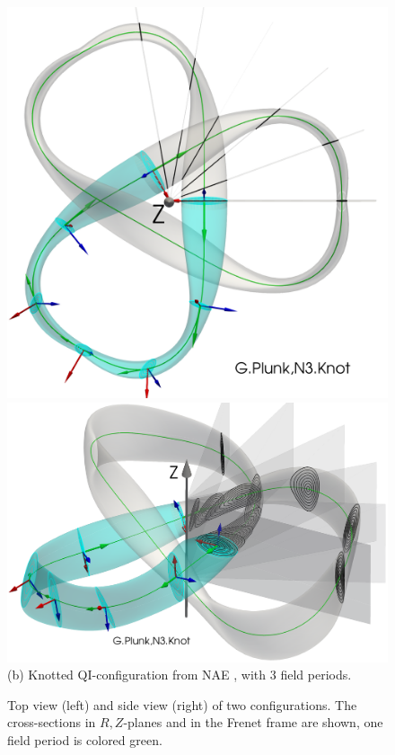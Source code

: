 \documentclass[12pt]{iopart}
\newcommand\RZplanes[1]{$R,Z$-planes{#1}}
\begin{document}
\begin{figure}[htbp!]
    \includegraphics[trim=0 0 0 0,clip,height=0.2\textheight]{pics/qi_nae_N3-Knot_visu3D_compare_topview.png}
    \includegraphics[trim=0 0 0 0,clip,height=0.2\textheight]{pics/qi_nae_N3-Knot_visu3D_compare_sideview.png} \\[1ex]
    (b) Knotted QI-configuration from NAE \cite{plunk2024-QI}, with 3 field periods.
    \caption{Top view (left) and side view (right) of two configurations. The cross-sections in \RZplanes{ } and in the Frenet frame are shown, one field period is colored green.}
    \label{fig:N7-QH-N3-knot}
\end{figure}
\end{document}
